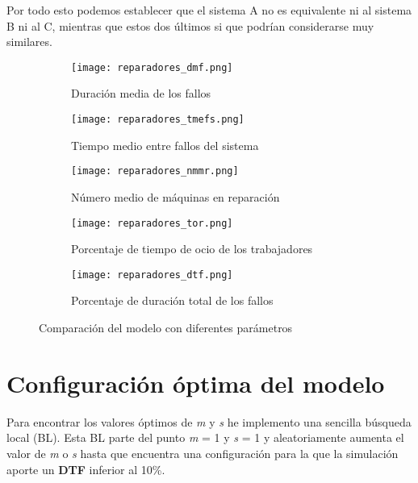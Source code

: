 Por todo esto podemos establecer que el sistema A no es equivalente ni al sistema B ni al C, mientras que estos dos últimos si que podrían considerarse muy similares.

\begin{figure}[H]
	\centering
	\begin{subfigure}[b]{0.45\textwidth}
		\centering
		\texttt{[image: reparadores\_dmf.png]}
		\caption{Duración media de los fallos}
	\end{subfigure}
	\hfill
	\begin{subfigure}[b]{0.45\textwidth}
		\centering
		\texttt{[image: reparadores\_tmefs.png]}
		\caption{Tiempo medio entre fallos del sistema}
	\end{subfigure}
	\hfill
	\begin{subfigure}[b]{0.45\textwidth}
		\centering
		\texttt{[image: reparadores\_nmmr.png]}
		\caption{Número medio de máquinas en reparación}
	\end{subfigure}
	\hfill
	\begin{subfigure}[b]{0.45\textwidth}
		\centering
		\texttt{[image: reparadores\_tor.png]}
		\caption{Porcentaje de tiempo de ocio de los trabajadores}
	\end{subfigure}
	\hfill
	\begin{subfigure}[b]{\textwidth}
		\centering
		\texttt{[image: reparadores\_dtf.png]}
		\caption{Porcentaje de duración total de los fallos}
	\end{subfigure}
	\hfill
	\caption{Comparación del modelo con diferentes parámetros}
\end{figure}

\section{Configuración óptima del modelo}
Para encontrar los valores óptimos de \textit{m} y \textit{s} he implemento una sencilla búsqueda local (BL). Esta BL parte del punto \textit{m} = 1 y \textit{s} = 1 y aleatoriamente aumenta el valor de \textit{m} o \textit{s} hasta que encuentra una configuración para la que la simulación aporte un \textbf{DTF} inferior al 10\%.

